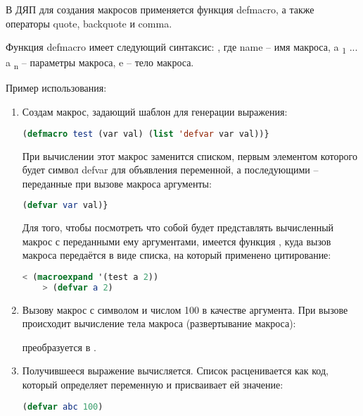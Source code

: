 В ДЯП для создания макросов применяется функция defmacro, а также операторы quote, backquote и comma.

Функция defmacro имеет следующий синтаксис:
, где name -- имя макроса, a \textsubscript 1 ... a \textsubscript n -- параметры макроса, e -- тело макроса.

Пример использования:

\begin{enumerate}
	\item Создам макрос, задающий шаблон для генерации выражения:
	
	\begin{lstlisting}[language=Lisp, frame=none]
	(defmacro test (var val) (list 'defvar var val))}
	\end{lstlisting}
	
	При вычислении этот макрос заменится списком, первым элементом которого будет символ defvar для объявления переменной, а последующими -- переданные при вызове макроса аргументы:
	
	\begin{lstlisting}[language=Lisp, frame=none]
	(defvar var val)}
	\end{lstlisting}
	
	Для того, чтобы посмотреть что собой будет представлять вычисленный макрос с переданными ему аргументами, имеется функция , куда вызов макроса передаётся в виде списка, на который применено цитирование:
	
	\begin{lstlisting}[language=Lisp, frame=none]
	< (macroexpand '(test a 2))
	> (defvar a 2)
	\end{lstlisting}
	
	\item Вызову макрос с символом  и числом 100 в качестве аргумента. При вызове происходит вычисление тела макроса (развертывание макроса):
	
	 преобразуется в .
	
	\item Получившееся выражение вычисляется. Список расценивается как код, который определяет переменную и присваивает ей значение:
	
	\begin{lstlisting}[language=Lisp, frame=none]
	(defvar abc 100)
	\end{lstlisting}
\end{enumerate}

